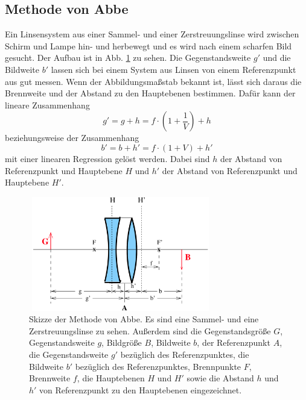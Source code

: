 \subsection{Methode von Abbe}
Ein Linsensystem aus einer Sammel- und einer Zerstreuungslinse wird zwischen Schirm und Lampe hin- und herbewegt und es wird nach einem scharfen Bild gesucht. Der Aufbau ist in Abb. \ref{fig:abbe} zu sehen.
Die Gegenstandsweite $g'$ und die Bildweite $b'$ lassen sich bei einem System aus Linsen von einem Referenzpunkt aus gut messen. 
Wenn der Abbildungsmaßstab bekannt ist, lässt sich daraus die Brennweite und der Abstand zu den Hauptebenen bestimmen. 
Dafür kann der lineare Zusammenhang 
\begin{equation}
    g' = g + h = f \cdot \left(1 + \frac{1}{V} \right) + h
    \label{eqn:gstrich}
\end{equation}
beziehungsweise der Zusammenhang 
\begin{equation}
    b' = b + h' = f \cdot \left(1 + V \right) + h'
    \label{eqn:bstrich}
\end{equation}
mit einer linearen Regression gelöst werden. 
Dabei sind $h$ der Abstand von Referenzpunkt und Hauptebene $H$ und $h'$ der Abstand von Referenzpunkt und Hauptebene $H'$.

\begin{figure}
    \centering
    \includegraphics[width=8cm, height=5cm]{build/abbe.png}
    \caption{Skizze der Methode von Abbe. Es sind eine Sammel- und eine Zerstreuungslinse zu sehen. Außerdem sind die Gegenstandsgröße $G$, Gegenstandsweite $g$, Bildgröße $B$, Bildweite $b$, der Referenzpunkt $A$, die Gegenstandsweite $g'$ bezüglich des Referenzpunktes, die Bildweite $b'$ bezüglich des Referenzpunktes, Brennpunkte $F$, Brennweite $f$, die Hauptebenen $H$ und $H'$ sowie die Abstand $h$ und $h'$ von Referenzpunkt zu den Hauptebenen eingezeichnet. \cite{V408}}
    \label{fig:abbe}
\end{figure}